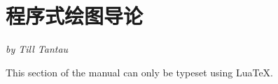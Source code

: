 %
%
%



\section{程序式绘图导论}
\label{section-intro-gd}

\emph{by Till Tantau}

\ifluatex\else This section of the manual can only be typeset using Lua\TeX.\expandafter\endinput\fi


\subsection{什么是程序式绘图？}


\emph{程序式绘图}（下文也称\emph{绘图}）
是一个程序式计算图上节点位置以达到输出“好看的”绘图效果的过程。
这个方法就是读者，作为人类（亦或恰巧在读这个文档的机器），
给出将要绘制的图上存在的点、边（余下的工作就由计算机完成了）。
除此之外，读者还可能需要添加一些“提示”比如 ``this node should be near the center''
或者 ``this edge is pretty important.'' 之类的。
你\emph{并不}需要明确给出点和边的位置。
这些就是你需要交给\emph{绘图}的东西。
绘图算法会解释出你对图的描述并决定节点在页面上的位置。

